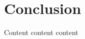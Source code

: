 \documentclass{sig-alternate}
\begin{document}
\section{Conclusion}
\label{sec:conclusion}

Content content content


\vspace{175pt}
\end{document}
